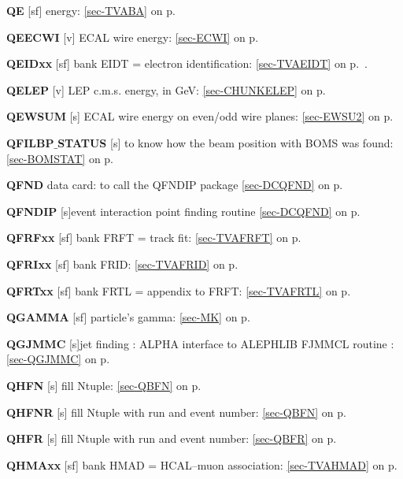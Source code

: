  \item{\bf QE      }[sf] energy: \ref{sec-TVABA} on p.~\pageref{sec-TVABA}\\
 \item{\bf QEECWI  }[v] ECAL wire energy: \ref{sec-ECWI} on p.~\pageref{sec-ECWI}\\
 \item{\bf QEIDxx  }[sf] bank EIDT = electron identification:
 \ref{sec-TVAEIDT} on p.~\pageref{sec-TVAEIDT}.\\
 \item{\bf QELEP   }[v] LEP c.m.s. energy, in GeV: \ref{sec-CHUNKELEP} on p.~\pageref{sec-CHUNKELEP}\\
 \item{\bf QEWSUM   }[s] ECAL wire energy on even/odd wire planes: \ref{sec-EWSU2} on p.~\pageref{sec-EWSU2}\\
 \item{\bf QFILBP$\_$STATUS   }[s] to know how the beam position with BOMS was found:
  \ref{sec-BOMSTAT} on p.~\pageref{sec-BOMSTAT}\\
 \item{\bf QFND    }data card: to call the QFNDIP package
 \ref{sec-DCQFND} on p.~\pageref{sec-DCQFND}\\
 \item{\bf QFNDIP  }[s]event interaction point finding routine
 \ref{sec-DCQFND} on p.~\pageref{sec-DCQFND}\\
 \item{\bf QFRFxx  }[sf] bank FRFT = track fit: \ref{sec-TVAFRFT} on p.~\pageref{sec-TVAFRFT}\\
 \item{\bf QFRIxx  }[sf] bank FRID: \ref{sec-TVAFRID} on p.~\pageref{sec-TVAFRID}\\
 \item{\bf QFRTxx  }[sf] bank FRTL = appendix to FRFT:
 \ref{sec-TVAFRTL} on p.~\pageref{sec-TVAFRTL}\\
 \item{\bf QGAMMA  }[sf] particle's gamma: \ref{sec-MK} on p.~\pageref{sec-MK}\\
 \item{\bf QGJMMC  }[s]jet finding : ALPHA interface to ALEPHLIB FJMMCL routine :
 \ref{sec-QGJMMC} on p.~\pageref{sec-QGJMMC}\\
 \item{\bf QHFN    }[s] fill Ntuple: \ref{sec-QBFN} on p.~\pageref{sec-QBFN}\\
 \item{\bf QHFNR   }[s] fill Ntuple with run and event number:
 \ref{sec-QBFN} on p.~\pageref{sec-QBFN}\\
 \item{\bf QHFR    }[s] fill Ntuple with run and event number:
 \ref{sec-QBFR} on p.~\pageref{sec-QBFR}\\
 \item{\bf QHMAxx  }[sf] bank HMAD = HCAL--muon association:
 \ref{sec-TVAHMAD} on p.~\pageref{sec-TVAHMAD}
 
